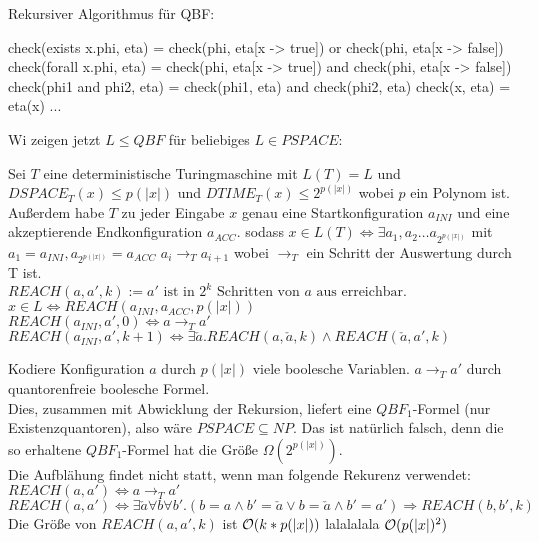 Rekursiver Algorithmus für QBF:
\begin{codebox}[javascript]
    check(exists x.phi, eta) =
        check(phi, eta[x -> true]) or
        check(phi, eta[x -> false])
    check(forall x.phi, eta) =
        check(phi, eta[x -> true]) and
        check(phi, eta[x -> false])
    check(phi1 and phi2, eta) =
        check(phi1, eta) and
        check(phi2, eta)
    check(x, eta) = eta(x)
        ...
\end{codebox}



Wi zeigen jetzt $L \leq QBF$ für beliebiges $L \in PSPACE$:

\begin{beweis}

    Sei $T$ eine deterministische Turingmaschine mit $L(T) = L$ und $DSPACE_T(x) \leq p(|x|)$ und $DTIME_T(x) \leq 2^{p(|x|)}$ wobei $p$ ein Polynom ist.
    Außerdem habe $T$ zu jeder Eingabe $x$ genau eine Startkonfiguration $a_{INI}$ und eine akzeptierende Endkonfiguration $a_{ACC}$.
    sodass $x \in L(T) \Leftrightarrow \exists
    a_1, a_2 \dots a_{2^{p(|x|)}}$ mit $a_1 = a_{INI}, a_{2^{p(|x|)}} = a_{ACC}$
    $a_i \rightarrow_T a_{i+1}$ wobei $\rightarrow_T$ ein Schritt der Auswertung durch T ist.
    \\
    $REACH(a, a', k) := a' \text{ ist in } 2^k \text{ Schritten von } a \text{ aus erreichbar. }$
    \\
    $x \in L \Leftrightarrow REACH(a_{INI}, a_{ACC}, p(|x|))$
    \\
    $REACH(a_{INI}, a', 0) \Leftrightarrow a \rightarrow_T a'$
    \\
    $REACH(a_{INI}, a', k+1) \Leftrightarrow \exists \check{a} . REACH(a, \check{a}, k) \land REACH(\check{a}, a', k)$

    Kodiere Konfiguration $a$ durch $p(|x|)$ viele boolesche Variablen. $a \rightarrow_T a'$ durch quantorenfreie boolesche Formel.
    \\
    Dies, zusammen mit Abwicklung der Rekursion, liefert eine $QBF_1$-Formel (nur Existenzquantoren), also wäre $PSPACE \subseteq NP$. Das ist natürlich falsch, denn die so erhaltene $QBF_1$-Formel hat die Größe $\Omega(2^{p(|x|)})$.
    \\
    Die Aufblähung findet nicht statt, wenn man folgende Rekurenz verwendet:
    \\
    $REACH(a,a') \Leftrightarrow a \rightarrow_T a'$
    \\
    $REACH(a,a') \Leftrightarrow \exists \check{a} \forall b \forall b' .
    (b = a \land b' = \check{a} \lor b = \check{a} \land b' = a') \Rightarrow REACH(b, b', k)$
    \\
    Die Größe von $REACH(a, a', k)$ ist $\mathcal{O}(k * p(|x|))$  lalalalala $\mathcal{O}(p(|x|)^2)$


\end{beweis}


